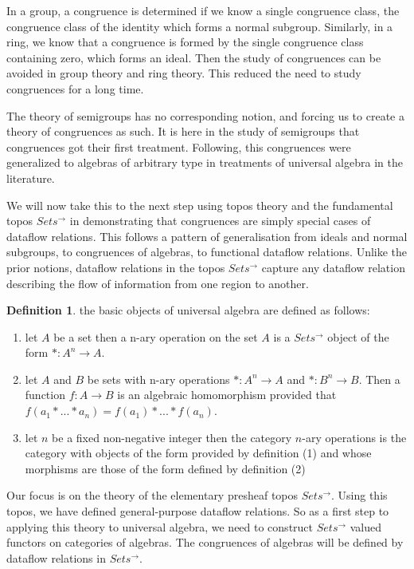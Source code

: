 \documentclass[a4paper,11pt, notitlepage]{report}
\theoremstyle{definition}
\newtheorem{definition}{Definition}[section]
\begin{document}
In a group, a congruence is determined if we know a single congruence class, the congruence class of the identity which forms a normal subgroup. Similarly, in a ring, we know that a congruence is formed by the single congruence class containing zero, which forms an ideal. Then the study of congruences can be avoided in group theory and ring theory. This reduced the need to study congruences for a long time.

The theory of semigroups has no corresponding notion, and forcing us to create a theory of congruences as such. It is here in the study of semigroups that congruences got their first treatment. Following, this congruences were generalized to algebras of arbitrary type in treatments of universal algebra in the literature.

We will now take this to the next step using topos theory and the fundamental topos $Sets^{\to}$ in demonstrating that congruences are simply special cases of dataflow relations. This follows a pattern of generalisation from ideals and normal subgroups, to congruences of algebras, to functional dataflow relations. Unlike the prior notions, dataflow relations in the topos $Sets^{\to}$ capture any dataflow relation describing the flow of information from one region to another.

\begin{definition} the basic objects of universal algebra are defined as follows:

\begin{enumerate}
 \item let $A$ be a set then a n-ary operation on the set $A$ is a $Sets^{\to}$ object of the form $*: A^n \to A$.

 \item let $A$ and $B$ be sets with n-ary operations $*: A^n \to A$ and $*: B^n \to B$. Then a function $f: A \to B$ is an algebraic homomorphism provided that $f(a_1*...*a_n) = f(a_1) * ... * f(a_n)$.

 \item let $n$ be a fixed non-negative integer then the category $n$-ary operations is the category with objects of the form provided by definition (1) and whose morphisms are those of the form defined by definition (2)
\end{enumerate}

\end{definition}

Our focus is on the theory of the elementary presheaf topos $Sets^{\to}$. Using this topos, we have defined general-purpose dataflow relations. So as a first step to applying this theory to universal algebra, we need to construct $Sets^{\to}$ valued functors on categories of algebras. The congruences of algebras will be defined by dataflow relations in $Sets^{\to}$.
\end{document}
